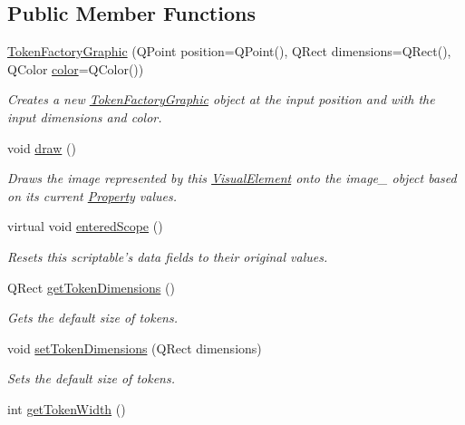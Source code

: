\subsection*{Public Member Functions}
\begin{DoxyCompactItemize}
\item 
\hyperlink{class_picto_1_1_token_factory_graphic_ab4ea320f2532ad5482d6cc17b7e8a889}{Token\-Factory\-Graphic} (Q\-Point position=Q\-Point(), Q\-Rect dimensions=Q\-Rect(), Q\-Color \hyperlink{struct_picto_1_1_visual_element_a45c3042c969717eb2ab60373369c7de7}{color}=Q\-Color())
\begin{DoxyCompactList}\small\item\em Creates a new \hyperlink{class_picto_1_1_token_factory_graphic}{Token\-Factory\-Graphic} object at the input position and with the input dimensions and color. \end{DoxyCompactList}\item 
\hypertarget{class_picto_1_1_token_factory_graphic_a4fa4be68f44043f26605bc6b65c14519}{void \hyperlink{class_picto_1_1_token_factory_graphic_a4fa4be68f44043f26605bc6b65c14519}{draw} ()}\label{class_picto_1_1_token_factory_graphic_a4fa4be68f44043f26605bc6b65c14519}

\begin{DoxyCompactList}\small\item\em Draws the image represented by this \hyperlink{struct_picto_1_1_visual_element}{Visual\-Element} onto the image\-\_\- object based on its current \hyperlink{class_picto_1_1_property}{Property} values. \end{DoxyCompactList}\item 
virtual void \hyperlink{class_picto_1_1_token_factory_graphic_a62c4631cefd8ad797ff690f4cf722473}{entered\-Scope} ()
\begin{DoxyCompactList}\small\item\em Resets this scriptable's data fields to their original values. \end{DoxyCompactList}\item 
Q\-Rect \hyperlink{class_picto_1_1_token_factory_graphic_af768324980a5dd9b773751a05ed76467}{get\-Token\-Dimensions} ()
\begin{DoxyCompactList}\small\item\em Gets the default size of tokens. \end{DoxyCompactList}\item 
void \hyperlink{class_picto_1_1_token_factory_graphic_afb7de80802742d3aeeebec59411fe576}{set\-Token\-Dimensions} (Q\-Rect dimensions)
\begin{DoxyCompactList}\small\item\em Sets the default size of tokens. \end{DoxyCompactList}\item 
\hypertarget{class_picto_1_1_token_factory_graphic_ae546aec1263d98829a278bded981c169}{int \hyperlink{class_picto_1_1_token_factory_graphic_ae546aec1263d98829a278bded981c169}{get\-Token\-Width} ()}\label{class_picto_1_1_token_factory_graphic_ae546aec1263d98829a278bded981c169}


\end{DoxyCompactItemize}
